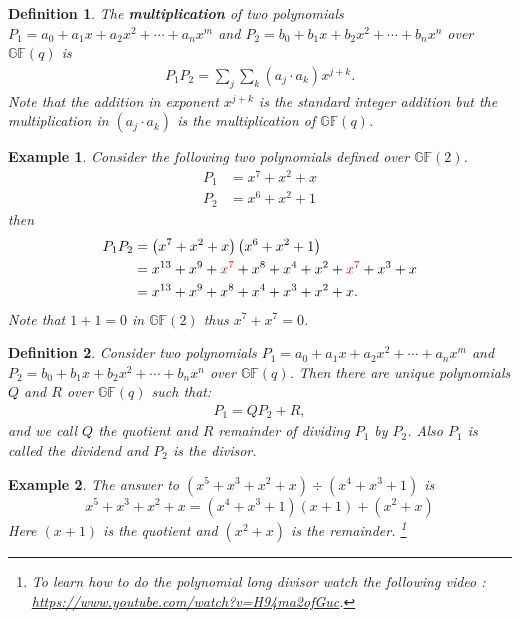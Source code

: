 \documentclass[12pt]{article}
\newtheorem{example}{Example}
\newtheorem{definition}{Definition}
\newcommand{\gf}[1]{\mathds{GF}\left(#1\right)} %
\begin{document}
\begin{definition}
	The \textbf{multiplication} of two polynomials $P_1 = a_0 + a_1 x + a_2 x^2 + \cdots + a_n x^m$ and $P_2 = b_0 + b_1 x + b_2 x^2 + \cdots + b_n x^n$ over $\gf{q}$ is 
	\begin{align*}
	P_1 P_2 = \sum_{j} \sum_{k} (a_j \cdot a_k) x^{j+k}.
	\end{align*}
	Note that the addition in exponent $x^{j+k}$ is the standard integer addition but the multiplication in $(a_j \cdot a_k)$ is the multiplication of $\gf{q}$.
\end{definition}


\begin{example}
	Consider the following two polynomials defined over $\gf{2}$. 
	\begin{align*}
		P_1 & = x^7 + x^2 + x \\
		P_2 & = x^6 + x^2 + 1
	\end{align*}
	then
	\begin{align*}
		P_1 P_2 &= \left(x^7 + x^2 + x \right)   \left(x^6 + x^2 + 1\right) \\
		& = x^{13} + x^9 + \textcolor{red}{x^7} + x^8 + x^4 + x^2 + \textcolor{red}{x^7} + x^3 + x \\
		& =  x^{13} + x^9 + x^8 + x^4 + x^3 + x^2  +  x .
	\end{align*}
	Note that $1+1=0$ in $\gf{2}$ thus $x^7 + x^7 = 0$.
\end{example}


\begin{definition}
	Consider two polynomials $P_1 = a_0 + a_1 x + a_2 x^2 + \cdots + a_n x^m$ and $P_2 = b_0 + b_1 x + b_2 x^2 + \cdots + b_n x^n$ over $\gf{q}$. Then there are unique polynomials $Q$ and $R$ over $\gf{q}$ such that:
	\begin{align*}
		P_1 = Q P_2 + R ,
	\end{align*} and we call $Q$ the quotient and $R$ remainder of dividing $P_1$ by $P_2$. Also $P_1$ is called the dividend and $P_2$ is the divisor. 
\end{definition}

\begin{example}
	The answer to $(x^5 + x^3 + x^2 + x) \div (x^4 + x^3 + 1)$ is
	$$x^5 + x^3 + x^2 + x = (x^4 + x^3 + 1) (x+1) + (x^2 +x) $$
	Here $(x+1)$ is the quotient and $(x^2 +x)$ is the remainder. \footnote{To learn how to do the polynomial long divisor watch the following video : \url{https://www.youtube.com/watch?v=H94ma2ofGuc}.}
\end{example}
\end{document}
